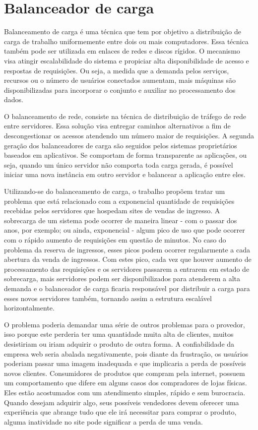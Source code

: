 \chapter{Balanceador de carga}

Balanceamento de carga é uma técnica que tem por objetivo a distribuição de carga de trabalho uniformemente entre dois ou
mais computadores. Essa técnica também pode ser utilizada em enlaces de redes e discos rígidos. O mecanismo visa atingir
escalabilidade do sistema e propiciar alta disponibilidade de acesso e respostas de requisições. Ou seja, a medida que a
demanda pelos serviços, recursos ou o número de usuários conectados aumentam, mais máquinas são disponibilizadas para incorporar
o conjunto e auxiliar no processamento dos dados.


O balanceamento de rede, consiste na técnica de distribuição de tráfego de rede entre servidores. Essa solução visa entregar
caminhos alternativos a fim de descongestionar os acessos atendendo um número maior de requisições. A segunda geração dos
balanceadores de carga são seguidos pelos sistemas proprietários baseados em aplicativos. Se comportam de forma transparente
as aplicações, ou seja, quando um único servidor não comporta toda carga gerada, é possível iniciar uma nova instância em
outro servidor e balancear a aplicação entre eles.


Utilizando-se do balanceamento de carga, o trabalho propõem tratar um problema que está relacionado com a exponencial
quantidade de requisições recebidas pelos servidores que hospedam sites de vendas de ingresso. A sobrecarga de um
sistema pode ocorrer de maneira linear - com o passar dos anos, por exemplo; ou ainda, exponencial - algum pico de uso
que pode ocorrer com o rápido aumento de requisições em questão de minutos.
No caso do problema da reserva de ingressos, esses picos podem ocorrer regularmente a cada abertura da venda de ingressos.
Com estes pico, cada vez que houver aumento de processamento das requisições e os servidores passarem a entrarem em
estado de sobrecarga, mais servidores podem ser disponibilizados para atenderem a alta demanda e o balanceador de carga
ficaria responsável por distribuir a carga para esses novos servidores também, tornando assim a estrutura escalável
horizontalmente.

O problema poderia demandar uma série de outros problemas para o provedor, isso porque este perderia ter uma quantidade muita
alta de clientes, muitos desistiriam ou iriam adquirir o produto de outra forma. A confiabilidade da empresa web seria
abalada negativamente, pois diante da frustração, os usuários poderiam passar uma imagem inadequada e que implicaria a perda
de possíveis novos clientes. Consumidores de produtos que compram pela internet, possuem um comportamento que difere em
alguns casos dos compradores de lojas físicas. Eles estão acostumados com um atendimento simples, rápido e sem burocracia.
Quando desejam adquirir algo, seus possíveis vendedores devem oferecer uma experiência que abrange tudo que ele irá
necessitar para comprar o produto, alguma inatividade no site pode significar a perda de uma venda.


